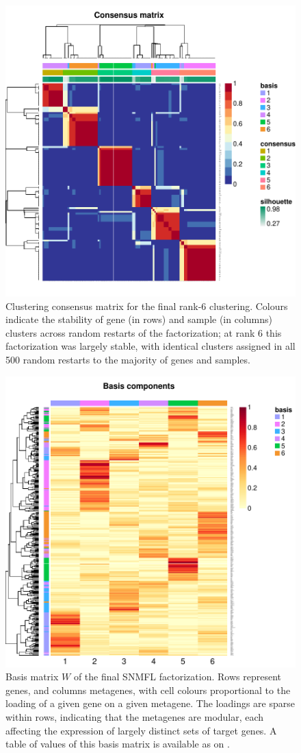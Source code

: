 \documentclass[dissertation.tex]{subfiles}
\begin{document}
\begin{figure}
\centering
\includegraphics[width=.7\linewidth]{analysis/biosurv/reports/18_SIS_diag_dsd_final/figure/nmf-plots-1}
\caption[Consensus matrix for the final rank-6 clustering]{Clustering consensus matrix for the final rank-6 clustering.  Colours indicate the stability of gene (in rows) and sample (in columns) clusters across random restarts of the factorization; at rank 6 this factorization was largely stable, with identical clusters assigned in all 500 random restarts to the majority of genes and samples.}\label{fig:sigs-nmf-consensus}
\end{figure}

\begin{figure}
\centering
\includegraphics[width=.7\linewidth]{analysis/biosurv/reports/18_SIS_diag_dsd_final/figure/nmf-plots-2}
\caption[Basis matrix $W$ of the final \acrshort{SNMFL} factorization]{Basis matrix $W$ of the final \acrshort{SNMFL} factorization.  Rows represent genes, and columns metagenes, with cell colours proportional to the loading of a given gene on a given metagene.  The loadings are sparse within rows, indicating that the metagenes are modular, each affecting the expression of largely distinct sets of target genes.  A table of values of this basis matrix is available as  on .}\label{fig:sigs-nmf-basis}
\end{figure}
\end{document}
